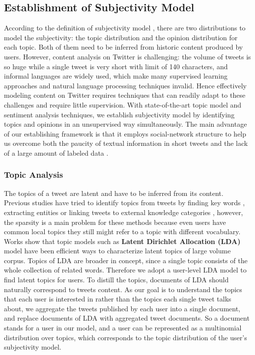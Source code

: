 \documentclass[runningheads,a4paper]{llncs}
\begin{document}
\subsection{Establishment of Subjectivity Model }
\label{establish}

According to the definition of subjectivity model , there are two distributions to model the subjectivity: the topic distribution and the opinion distribution for each topic. Both of them need to be inferred from historic content produced by users.
However, content analysis on Twitter is challenging: the volume of tweets is so huge while a single tweet is very short with limit of 140 characters, and informal languages are widely used, which make many supervised learning approaches and natural language processing techniques invalid. 
Hence effectively modeling content on Twitter requires techniques that can readily adapt to these challenges and require little supervision. 
With state-of-the-art topic model and sentiment analysis techniques, we establish subjectivity model by identifying topics and opinions in an unsupervised way simultaneously. The main advantage of our establishing framework is that it employs social-network structure to help us overcome both the paucity of textual information in short tweets and the lack of a large amount of labeled data \cite{lin2010comparative}.


\subsubsection{Topic Analysis}
\label{topic}

The topics of a tweet are latent and have to be inferred from its content.
Previous studies have tried to identify topics from tweets by finding key words \cite{chen2010short}, extracting  entities \cite{abel2011analyzing} or linking tweets to external knowledge categories \cite{macskassy2011people}, however, the sparsity is a main problem for these methods because even users have common local topics they still might refer to a topic with different vocabulary.
Works show that topic models such as \textbf{Latent Dirichlet Allocation (LDA)} model \cite{blei2003latent} have been efficient ways to characterize latent topics of large volume corpus.  
Topics of LDA are broader in concept, since a single topic consists of the whole collection of related words. 
Therefore we adopt a user-level LDA model to find latent topics for users.
To distill the topics, documents of LDA should naturally correspond to tweets content. 
As our goal is to understand the topics that each user is interested in rather than the topics each single tweet talks about, we aggregate the tweets published by each user into a single document, and replace documents of LDA with aggregated tweet documents. 
So a document stands for a user in our model, and a user can be represented as a multinomial distribution over topics, which corresponds to the topic distribution of the user's subjectivity model.
\end{document}
